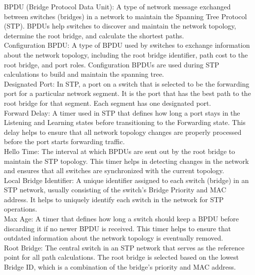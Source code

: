 \documentclass{article}
\begin{document}
BPDU (Bridge Protocol Data Unit): A type of network message exchanged between switches (bridges) in a network to maintain the Spanning Tree Protocol (STP). BPDUs help switches to discover and maintain the network topology, determine the root bridge, and calculate the shortest paths.\\

Configuration BPDU: A type of BPDU used by switches to exchange information about the network topology, including the root bridge identifier, path cost to the root bridge, and port roles. Configuration BPDUs are used during STP calculations to build and maintain the spanning tree.\\

Designated Port: In STP, a port on a switch that is selected to be the forwarding port for a particular network segment. It is the port that has the best path to the root bridge for that segment. Each segment has one designated port.\\

Forward Delay: A timer used in STP that defines how long a port stays in the Listening and Learning states before transitioning to the Forwarding state. This delay helps to ensure that all network topology changes are properly processed before the port starts forwarding traffic.\\

Hello Time: The interval at which BPDUs are sent out by the root bridge to maintain the STP topology. This timer helps in detecting changes in the network and ensures that all switches are synchronized with the current topology.\\

Local Bridge Identifier: A unique identifier assigned to each switch (bridge) in an STP network, usually consisting of the switch's Bridge Priority and MAC address. It helps to uniquely identify each switch in the network for STP operations.\\

Max Age: A timer that defines how long a switch should keep a BPDU before discarding it if no newer BPDU is received. This timer helps to ensure that outdated information about the network topology is eventually removed.\\

Root Bridge: The central switch in an STP network that serves as the reference point for all path calculations. The root bridge is selected based on the lowest Bridge ID, which is a combination of the bridge’s priority and MAC address.\\
\end{document}

